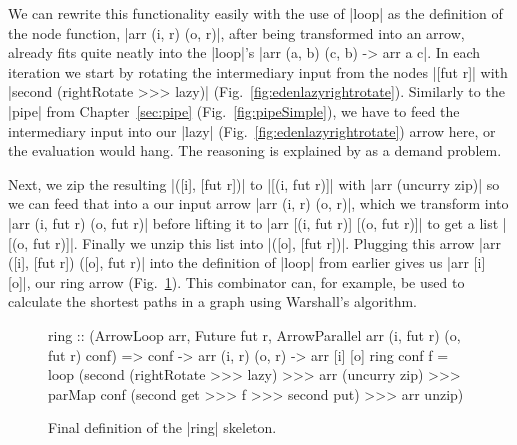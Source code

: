 We can rewrite this functionality easily with the use of |loop| as the definition of the node function, |arr (i, r) (o, r)|, after being transformed into an arrow, already fits quite neatly into the |loop|'s |arr (a, b) (c, b) -> arr a c|. In each iteration we start by rotating the intermediary input from the nodes |[fut r]| with |second (rightRotate >>> lazy)| (Fig.~\ref{fig:edenlazyrightrotate}). Similarly to the |pipe| from Chapter~\ref{sec:pipe} (Fig.~\ref{fig:pipeSimple}), we have to feed the intermediary input into our |lazy| (Fig.~\ref{fig:edenlazyrightrotate}) arrow here, or the evaluation would hang. The reasoning is explained by \citet{Loogen2012} as a demand problem.

Next, we zip the resulting |([i], [fut r])| to |[(i, fut r)]| with |arr (uncurry zip)| so we can feed that into a our input arrow |arr (i, r) (o, r)|, which we transform into |arr (i, fut r) (o, fut r)| before lifting it to |arr [(i, fut r)] [(o, fut r)]| to get a list |[(o, fut r)]|. Finally we unzip this list into |([o], [fut r])|. Plugging this arrow |arr ([i], [fut r]) ([o], fut r)| into the definition of |loop| from earlier gives us |arr [i] [o]|, our ring arrow (Fig.~\ref{fig:ringFinal}).
This combinator can, for example, be used to calculate the shortest paths in a graph using Warshall's algorithm.


\begin{figure}[h]
\begin{code}
ring :: (ArrowLoop arr, Future fut r, ArrowParallel arr (i, fut r) (o, fut r) conf) =>
    conf -> arr (i, r) (o, r) -> arr [i] [o]
ring conf f =
	loop (second (rightRotate >>> lazy) >>> arr (uncurry zip) >>>
        parMap conf (second get >>> f >>> second put) >>> arr unzip)
\end{code}
\caption{Final definition of the |ring| skeleton.}
\label{fig:ringFinal}
\end{figure}

